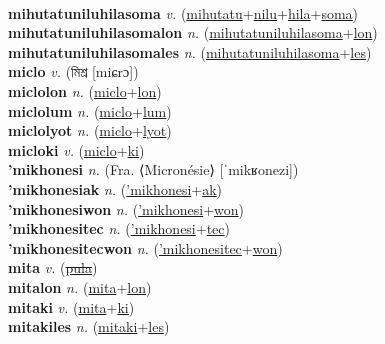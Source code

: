 \label{mihutatulon} \\
\textbf{mihutatuniluhilasoma} \textit{v.} (\hyperref[mihutatu]{mihutatu}+\hyperref[nilu]{nilu}+\hyperref[hila]{hila}+\hyperref[soma]{soma})
 \label{mihutatuniluhilasoma} \\
\textbf{mihutatuniluhilasomalon} \textit{n.} (\hyperref[mihutatuniluhilasoma]{mihutatuniluhilasoma}+\hyperref[lon]{lon})
 \label{mihutatuniluhilasomalon} \\
\textbf{mihutatuniluhilasomales} \textit{n.} (\hyperref[mihutatuniluhilasoma]{mihutatuniluhilasoma}+\hyperref[les]{les})
 \label{mihutatuniluhilasomales} \\
\textbf{miclo} \textit{v.} ({\bengali{}মিশ্র} [miɕrɔ])
 \label{miclo} \\
\textbf{miclolon} \textit{n.} (\hyperref[miclo]{miclo}+\hyperref[lon]{lon})
 \label{miclolon} \\
\textbf{miclolum} \textit{n.} (\hyperref[miclo]{miclo}+\hyperref[lum]{lum})
 \label{miclolum} \\
\textbf{miclolyot} \textit{n.} (\hyperref[miclo]{miclo}+\hyperref[lyot]{lyot})
 \label{miclolyot} \\
\textbf{micloki} \textit{v.} (\hyperref[miclo]{miclo}+\hyperref[ki]{ki})
 \label{micloki} \\
\textbf{'mikhonesi} \textit{n.} (Fra. ⟨Micronésie⟩ [ˈmikʁonezi])
 \label{'mikhonesi} \\
\textbf{'mikhonesiak} \textit{n.} (\hyperref['mikhonesi]{'mikhonesi}+\hyperref[ak]{ak})
 \label{'mikhonesiak} \\
\textbf{'mikhonesiwon} \textit{n.} (\hyperref['mikhonesi]{'mikhonesi}+\hyperref[won]{won})
 \label{'mikhonesiwon} \\
\textbf{'mikhonesitec} \textit{n.} (\hyperref['mikhonesi]{'mikhonesi}+\hyperref[tec]{tec})
 \label{'mikhonesitec} \\
\textbf{'mikhonesitecwon} \textit{n.} (\hyperref['mikhonesitec]{'mikhonesitec}+\hyperref[won]{won})
 \label{'mikhonesitecwon} \\
\textbf{mita} \textit{v.} (\hyperref[pula]{\sout{pula}})
 \label{mita} \\
\textbf{mitalon} \textit{n.} (\hyperref[mita]{mita}+\hyperref[lon]{lon})
 \label{mitalon} \\
\textbf{mitaki} \textit{v.} (\hyperref[mita]{mita}+\hyperref[ki]{ki})
 \label{mitaki} \\
\textbf{mitakiles} \textit{n.} (\hyperref[mitaki]{mitaki}+\hyperref[les]{les})
 \label{mitakiles} \\
